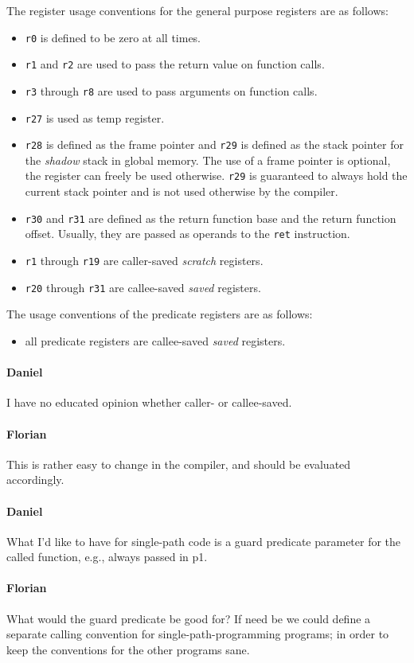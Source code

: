\documentclass{IEEEtran}
\newcommand{\comment}[3]{\paragraph*{\textbf{#1}}{\color{#3}#2}}
\newcommand{\daniel}[1]{\comment{Daniel}{#1}{RoyalBlue}}
\newcommand{\fb}[1]{\comment{Florian}{#1}{Emerald}}
\begin{document}
The register usage conventions for the general purpose registers are as follows:
\begin{itemize}
  \item \texttt{r0} is defined to be zero at all times.
  \item \texttt{r1} and \texttt{r2} are used to pass the return value on
        function calls.
  \item \texttt{r3} through \texttt{r8} are used to pass arguments on function
        calls.
  \item \texttt{r27} is used as temp register.
  \item \texttt{r28} is defined as the frame pointer and \texttt{r29} is defined as the stack
        pointer for the \emph{shadow} stack in global memory. The use of a frame
        pointer is optional, the register can freely be used otherwise. 
	\texttt{r29} is guaranteed to always hold the current stack pointer and is not used 
	otherwise by the compiler.
  \item \texttt{r30} and \texttt{r31} are defined as the return function base
        and the return function offset.
        Usually, they are passed as operands to the \texttt{ret} instruction.
  \item \texttt{r1} through \texttt{r19} are caller-saved \emph{scratch}
        registers.
  \item \texttt{r20} through \texttt{r31} are callee-saved \emph{saved}
        registers.
\end{itemize}

The usage conventions of the predicate registers are as follows:
\begin{itemize}
  \item all predicate registers are callee-saved \emph{saved} registers.
\end{itemize}

\daniel{I have no educated opinion whether caller- or callee-saved.}
\fb{This is rather easy to change in the compiler, and should be evaluated
accordingly.}

\daniel{
What I'd like to have for single-path code is a guard predicate parameter for the called function, e.g., always passed in p1.
}
\fb{What would the guard predicate be good for? If need be we could define a
separate calling convention for single-path-programming programs; in order to
keep the conventions for the other programs sane.}
\end{document}
